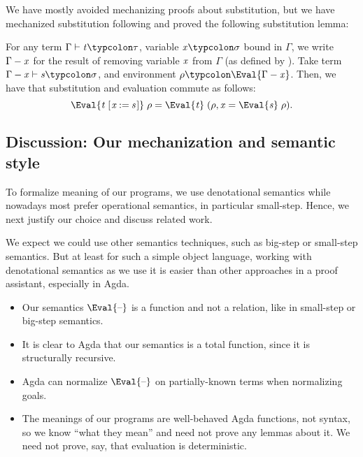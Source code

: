 We have mostly avoided mechanizing proofs about substitution, but
we have mechanized substitution following
\citet{Keller2010hereditary} and proved the following
substitution lemma:
\begin{lemma}
  For any term \ensuremath{\Gamma\vdash\Varid{t}\typcolon\tau}, variable \ensuremath{\Varid{x}\typcolon\sigma} bound in \ensuremath{\Gamma}, we write \ensuremath{\Gamma\mathbin{-}\Varid{x}} for the result of
  removing variable \ensuremath{\Varid{x}} from \ensuremath{\Gamma} (as defined by \citeauthor{Keller2010hereditary}).
  Take term \ensuremath{\Gamma\mathbin{-}\Varid{x}\vdash\Varid{s}\typcolon\sigma}, and
  environment \ensuremath{\rho\typcolon\Eval{\Gamma\mathbin{-}\Varid{x}}}.
  Then, we have that substitution and evaluation commute as follows:
  \[\ensuremath{\Eval{\Varid{t}\;[\mskip1.5mu \Varid{x}\mathbin{:=}\Varid{s}\mskip1.5mu]}\;\rho\mathrel{=}\Eval{\Varid{t}}\;(\rho,\Varid{x}\mathrel{=}\Eval{\Varid{s}}\;\rho)}.\]
\end{lemma}

\subsection{Discussion: Our mechanization and semantic style}
\label{sec:sem-style-and-rw}
To formalize meaning of our programs, we use denotational
semantics while nowadays most prefer operational semantics, in
particular small-step. Hence, we next justify our choice and
discuss related work.

We expect we could use other semantics techniques, such as
big-step or small-step semantics. But at least for such a simple
object language, working with denotational semantics as we use it
is easier than other approaches in a proof assistant, especially
in Agda.

\begin{itemize}
\item Our semantics \ensuremath{\Eval{\text{\textendash}}} is a function and not a
  relation, like in small-step or big-step semantics.
\item It is clear to Agda that our semantics is a total function,
  since it is structurally recursive.
\item Agda can normalize \ensuremath{\Eval{\text{\textendash}}} on partially-known terms
  when normalizing goals.
\item The meanings of our programs are well-behaved Agda
  functions, not syntax, so we know ``what they mean'' and need
  not prove any lemmas about it. We need not prove, say, that
  evaluation is deterministic.
\end{itemize}

